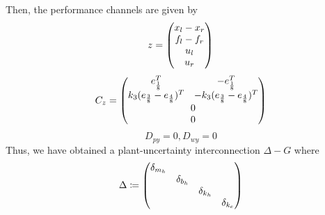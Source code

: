 Then, the performance channels are given by
\[
\begin{array}{rl}
z = \begin{pmatrix}x_l-x_r\\f_l-f_r\\u_l\\u_r\end{pmatrix}
\end{array}
\]
\[
C_z = \pmatr{e_\frac{1}{8}^T &-e_\frac{1}{8}^T\\k_3(e_\frac{3}{8} -e_\frac{4}{8})^T &-k_3(e_\frac{3}{8} -e_\frac{4}{8})^T\\ \multicolumn{2}{c}{0}\\ \multicolumn{2}{c}{0}}
\]
\[
D_{py} = 0, D_{wy} = 0
\]
Thus, we have obtained a plant-uncertainty interconnection $\Delta-G$ where 
\begin{equation}
\Delta\coloneqq \begin{pmatrix}\delta_{m_h}&&&\\&\delta_{b_h}&&\\&&\delta_{k_h}&\\&&&\delta_{k_e}\end{pmatrix}
\label{eq:realisticunc}
\end{equation}


%
%
%
%




